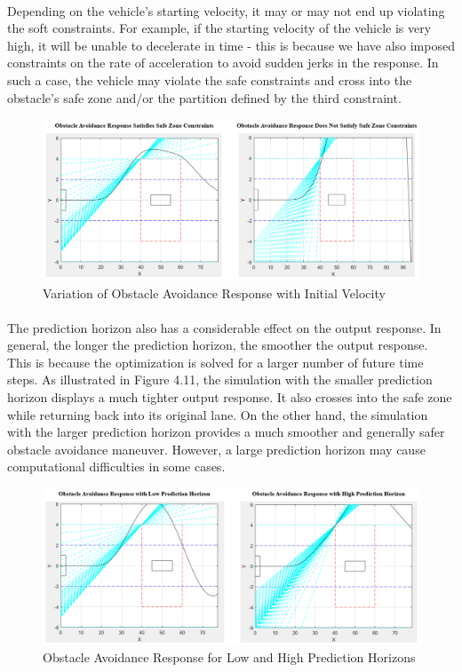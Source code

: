 \paragraph{}
Depending on the vehicle's starting velocity, it may or may not end up violating the soft constraints. For example, if the starting velocity of the vehicle is very high, it will be unable to decelerate in time - this is because we have also imposed constraints on the rate of acceleration to avoid sudden jerks in the response. In such a case, the vehicle may violate the safe constraints and cross into the obstacle's safe zone and/or the partition defined by the third constraint.

\begin{figure}[H]\label{fig4.10}
\centering \includegraphics[width=\textwidth]{Images/satisfies_and_violate_safe_zone.png}
\caption{Variation of Obstacle Avoidance Response with Initial Velocity}
\end{figure}

\paragraph{}
The prediction horizon also has a considerable effect on the output response. In general, the longer the prediction horizon, the smoother the output response. This is because the optimization is solved for a larger number of future time steps. As illustrated in Figure 4.11, the simulation with the smaller prediction horizon displays a much tighter output response. It also crosses into the safe zone while returning back into its original lane. On the other hand, the simulation with the larger prediction horizon provides a much smoother and generally safer obstacle avoidance maneuver. However, a large prediction horizon may cause computational difficulties in some cases.

\begin{figure}[H]\label{fig4.11}
\centering \includegraphics[width=\textwidth]{Images/high_vs_low_prediction_horizon.png}
\caption{Obstacle Avoidance Response for Low and High Prediction Horizons}
\end{figure}

